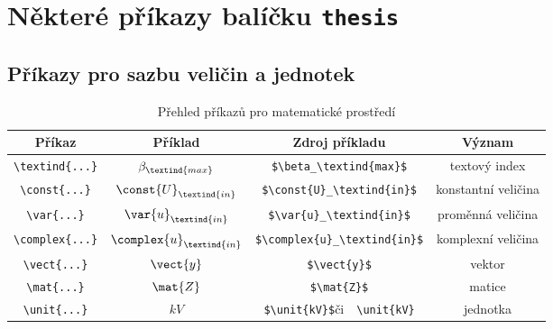 

  \clearpage
  

  \clearpage
  





\iffalse
\chapter{Některé příkazy balíčku \texttt{thesis}}

\section{Příkazy pro sazbu veličin a jednotek}

\begin{table}[!h]
  \caption[Přehled příkazů]{Přehled příkazů pro matematické prostředí }
  \begin{center}
  	\small
	  \begin{tabular}{|c|c|c|c|}
	    \hline
	    Příkaz    						& Příklad 					& Zdroj příkladu  							& Význam  \\
	    \hline\hline
	    \verb|\textind{...}|	& $\beta_\textind{max}$ 	& \verb|$\beta_\textind{max}$|	& textový index \\
	    \hline
	    \verb|\const{...}| 		& $\const{U}_\textind{in}$ 				& \verb|$\const{U}_\textind{in}$|		& konstantní veličina \\
	    \hline
	    \verb|\var{...}| 		& $\var{u}_\textind{in}$ & \verb|$\var{u}_\textind{in}$| & proměnná veličina \\
	    \hline
	    \verb|\complex{...}| 	& $\complex{u}_\textind{in}$ & \verb|$\complex{u}_\textind{in}$| & komplexní veličina \\
	    \hline
	    \verb|\vect{...}| 		& $\vect{y}$ 						& \verb|$\vect{y}$| & vektor \\
	    \hline
	    \verb|\mat{...}| 	& $\mat{Z}$ 						& \verb|$\mat{Z}$| & matice \\
	    \hline
	    \verb|\unit{...}| 		& $\unit{kV}$ 						& \verb|$\unit{kV}$|\quad či\ \, \verb|\unit{kV}| & jednotka \\
	    \hline
	  \end{tabular}
  \end{center}
\end{table}



